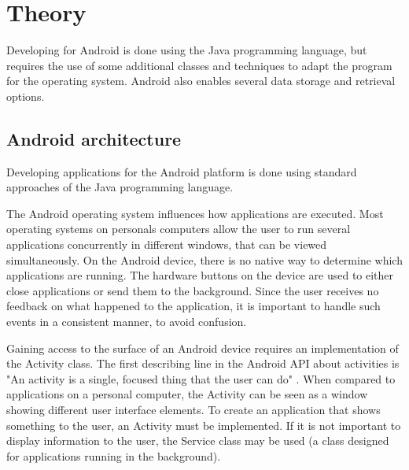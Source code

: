 \chapter{Theory}

Developing for Android is done using the Java programming language, but requires the use of some additional classes and techniques to adapt the program for the operating system. Android also enables several data storage and retrieval options.

\section{Android architecture}

Developing applications for the Android platform is done using standard approaches of the Java programming language.

The Android operating system influences how applications are executed. Most operating systems on personals computers allow the user to run several applications concurrently in different windows, that can be viewed simultaneously. On the Android device, there is no native way to determine which applications are running. The hardware buttons on the device are used to either close applications or send them to the background. Since the user receives no feedback on what happened to the application, it is important to handle such events in a consistent manner, to avoid confusion.
 
Gaining access to the surface of an Android device requires an implementation of the Activity class. The first describing line in the Android API about activities is "An activity is a single, focused thing that the user can do" \citep{Android}. When compared to applications on a personal computer, the Activity can be seen as a window showing different user interface elements. To create an application that shows something to the user, an Activity must be implemented. If it is not important to display information to the user, the Service class may be used (a class designed for applications running in the background).

